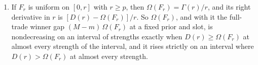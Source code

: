 \begin{proposition}
\begin{enumerate}[label=(\roman*),leftmargin=2em]
\(W_H(F_r)=1\) at every strength. At strengths with full two-sided trade, the winner gap
\(W_{F_r}(M)-W_{F_r}(m)=(M-m)\,[1-W_L(F_r)]\) is nondecreasing in \(r\), and it is larger at \(r'\) than at
\(r<r'\) exactly when \(W_L(F_{r'})<W_L(F_r)\).
\item If \(F_r\) is uniform on \([0,r]\) with \(r\ge p\), then \(\Omega(F_r)=\Gamma(r)/r\), and its right derivative
in \(r\) is \([D(r)-\Omega(F_r)]/r\). So \(\Omega(F_r)\), and with it the full-trade winner gap
\((M-m)\,\Omega(F_r)\) at a fixed prior and slot, is nondecreasing on an interval of strengths exactly when
\(D(r)\ge\Omega(F_r)\) at almost every strength of the interval, and it rises strictly on an interval where
\(D(r)>\Omega(F_r)\) at almost every strength.
\end{enumerate}
\end{proposition}


